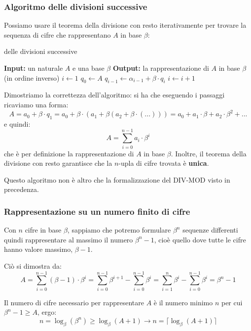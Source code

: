 \documentclass[a4paper,11pt]{article}
\begin{document}
\subsubsection{Algoritmo delle divisioni successive}
Possiamo usare il teorema della divisione con resto iterativamente per trovare la sequenza di cifre che rappresentano $A$ in base $\beta$:
\begin{algorithm}[H]
\caption{delle divisioni successive}
\begin{algorithmic}
	\STATE \textbf{Input:} un naturale $A$ e una base $\beta$ %
	\STATE \textbf{Output:} la rappresentazione di $A$ in base $\beta$ (in ordine inverso) %
	\STATE$i \gets 1$
	\STATE$q_0 \gets A$
		\STATE $q_{i-1} \gets \alpha_{i-1} + \beta \cdot q_i$
		\STATE $i \gets i + 1$
	\ENDWHILE
\end{algorithmic}
\end{algorithm}

Dimostriamo la correttezza dell'algoritmo: si ha che eseguendo i passaggi ricaviamo una forma:
$$ 
A = a_0 + \beta \cdot q_1 = a_0 + \beta \cdot (a_1 + \beta (a_2 + \beta \cdot (...))) = a_0 + a_1 \cdot \beta + a_2 \cdot \beta^2 + ...
$$
e quindi:
$$ 
A = \sum_{i=0}^{n-1} a_i \cdot \beta^i
$$
che è per definizione la rappresentazione di $A$ in base $\beta$.
Inoltre, il teorema della divisione con resto garantisce che la $n$-upla di cifre trovata è \textbf{unica}.

Questo algoritmo non è altro che la formalizzazione del DIV-MOD visto in precedenza.

\subsubsection{Rappresentazione su un numero finito di cifre}
Con $n$ cifre in base $\beta$, sappiamo che potremo formulare $\beta^n$ sequenze differenti quindi rappresentare al massimo il numero $\beta^n - 1$, cioè quello dove tutte le cifre hanno valore massimo, $\beta - 1$.

Ciò si dimostra da:
$$
A = \sum_{i=0}^{n-1} (\beta - 1) \cdot \beta^i = \sum_{i=0}^{n-1} \beta^{i + 1} - \sum_{i=0}^{n-1} \beta^i = \sum_{i=1}^{n} \beta^{i} - \sum_{i=0}^{n-1} \beta^i  = \beta^n - 1 $$

Il numero di cifre necessario per rappresentare $A$ è il numero minimo $n$ per cui $\beta^n - 1 \geq A$, ergo:
$$
n = \log_\beta (\beta^n) \geq \log_\beta (A + 1) \rightarrow n = \lceil \log_\beta (A + 1) \rceil
$$
\end{document}

